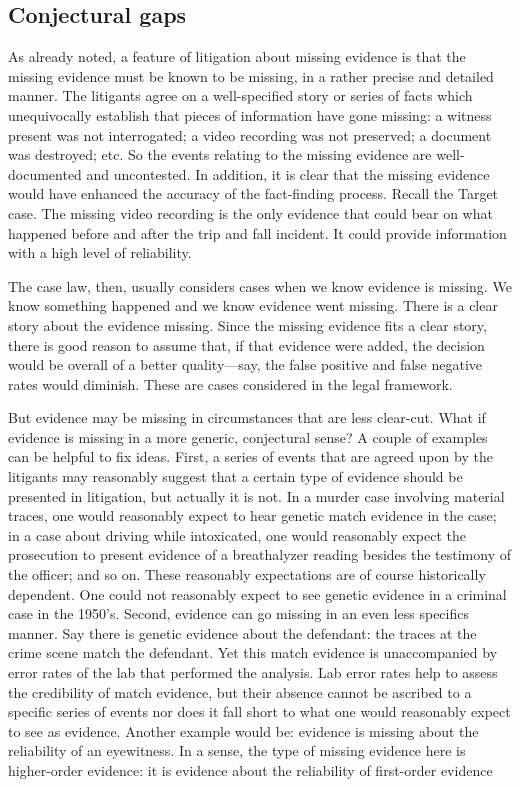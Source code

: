 \documentclass[
  10pt,
  dvipsnames,enabledeprecatedfontcommands]{scrartcl}
\begin{document}
\hypertarget{conjectural-gaps}{%
\subsection{Conjectural gaps}\label{conjectural-gaps}}

As already noted, a feature of litigation about missing evidence is that
the missing evidence must be known to be missing, in a rather precise
and detailed manner. The litigants agree on a well-specified story or
series of facts which unequivocally establish that pieces of information
have gone missing: a witness present was not interrogated; a video
recording was not preserved; a document was destroyed; etc. So the
events relating to the missing evidence are well-documented and
uncontested. In addition, it is clear that the missing evidence would
have enhanced the accuracy of the fact-finding process. Recall the
Target case. The missing video recording is the only evidence that could
bear on what happened before and after the trip and fall incident. It
could provide information with a high level of reliability.

The case law, then, usually considers cases when we know evidence is
missing. We know something happened and we know evidence went missing.
There is a clear story about the evidence missing. Since the missing
evidence fits a clear story, there is good reason to assume that, if
that evidence were added, the decision would be overall of a better
quality---say, the false positive and false negative rates would
diminish. These are cases considered in the legal framework.

But evidence may be missing in circumstances that are less clear-cut.
What if evidence is missing in a more generic, conjectural sense? A
couple of examples can be helpful to fix ideas. First, a series of
events that are agreed upon by the litigants may reasonably suggest that
a certain type of evidence should be presented in litigation, but
actually it is not. In a murder case involving material traces, one
would reasonably expect to hear genetic match evidence in the case; in a
case about driving while intoxicated, one would reasonably expect the
prosecution to present evidence of a breathalyzer reading besides the
testimony of the officer; and so on. These reasonably expectations are
of course historically dependent. One could not reasonably expect to see
genetic evidence in a criminal case in the 1950's. Second, evidence can
go missing in an even less specifics manner. Say there is genetic
evidence about the defendant: the traces at the crime scene match the
defendant. Yet this match evidence is unaccompanied by error rates of
the lab that performed the analysis. Lab error rates help to assess the
credibility of match evidence, but their absence cannot be ascribed to a
specific series of events nor does it fall short to what one would
reasonably expect to see as evidence. Another example would be: evidence
is missing about the reliability of an eyewitness. In a sense, the type
of missing evidence here is higher-order evidence: it is evidence about
the reliability of first-order evidence
\end{document}
